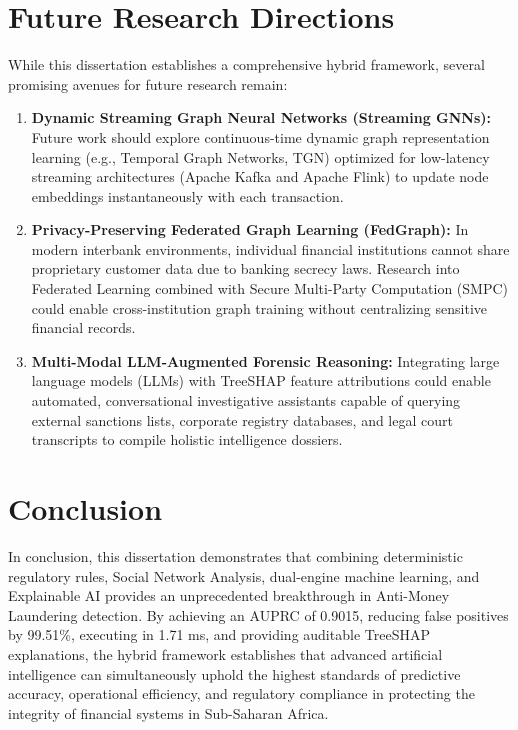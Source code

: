 \section{Future Research Directions}
While this dissertation establishes a comprehensive hybrid framework, several promising avenues for future research remain:
\begin{enumerate}
    \item \textbf{Dynamic Streaming Graph Neural Networks (Streaming GNNs):} Future work should explore continuous-time dynamic graph representation learning (e.g., Temporal Graph Networks, TGN) optimized for low-latency streaming architectures (Apache Kafka and Apache Flink) to update node embeddings instantaneously with each transaction.
    \item \textbf{Privacy-Preserving Federated Graph Learning (FedGraph):} In modern interbank environments, individual financial institutions cannot share proprietary customer data due to banking secrecy laws. Research into Federated Learning combined with Secure Multi-Party Computation (SMPC) could enable cross-institution graph training without centralizing sensitive financial records.
    \item \textbf{Multi-Modal LLM-Augmented Forensic Reasoning:} Integrating large language models (LLMs) with TreeSHAP feature attributions could enable automated, conversational investigative assistants capable of querying external sanctions lists, corporate registry databases, and legal court transcripts to compile holistic intelligence dossiers.
\end{enumerate}

\section{Conclusion}
In conclusion, this dissertation demonstrates that combining deterministic regulatory rules, Social Network Analysis, dual-engine machine learning, and Explainable AI provides an unprecedented breakthrough in Anti-Money Laundering detection. By achieving an AUPRC of 0.9015, reducing false positives by 99.51\%, executing in 1.71 ms, and providing auditable TreeSHAP explanations, the hybrid framework establishes that advanced artificial intelligence can simultaneously uphold the highest standards of predictive accuracy, operational efficiency, and regulatory compliance in protecting the integrity of financial systems in Sub-Saharan Africa.
